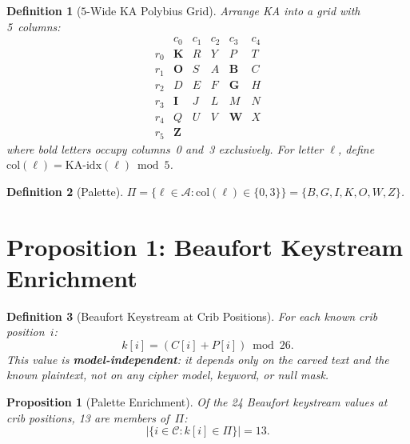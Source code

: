 \documentclass[11pt]{article}
\newtheorem{proposition}{Proposition}
\newtheorem{definition}{Definition}
\theoremstyle{remark}
\begin{document}
\begin{definition}[$5$-Wide KA Polybius Grid]\label{def:grid}
Arrange KA into a grid with 5~columns:
\[
\begin{array}{c|ccccc}
      & c_0 & c_1 & c_2 & c_3 & c_4 \\ \hline
r_0 & \mathbf{K} & R & Y & P & T \\
r_1 & \mathbf{O} & S & A & \mathbf{B} & C \\
r_2 & D & E & F & \mathbf{G} & H \\
r_3 & \mathbf{I} & J & L & M & N \\
r_4 & Q & U & V & \mathbf{W} & X \\
r_5 & \mathbf{Z} &   &   &   &
\end{array}
\]
where bold letters occupy columns~0 and~3 exclusively.
For letter $\ell$, define $\mathrm{col}(\ell) = \mathrm{KA\text{-}idx}(\ell) \bmod 5$.
\end{definition}

\begin{definition}[Palette]
$\Pi = \{\ell \in \mathcal{A} : \mathrm{col}(\ell) \in \{0, 3\}\}
     = \{B, G, I, K, O, W, Z\}$.
\end{definition}

\section{Proposition 1: Beaufort Keystream Enrichment}

\begin{definition}[Beaufort Keystream at Crib Positions]
For each known crib position~$i$:
\[
k[i] = (C[i] + P[i]) \bmod 26.
\]
This value is \textbf{model-independent}: it depends only on the
carved text and the known plaintext, not on any cipher model,
keyword, or null mask.
\end{definition}

\begin{proposition}[Palette Enrichment]\label{prop:keystream}
Of the 24 Beaufort keystream values at crib positions, 13 are
members of~$\Pi$:
\[
|\{i \in \mathcal{C} : k[i] \in \Pi\}| = 13.
\]
\end{proposition}
\end{document}
